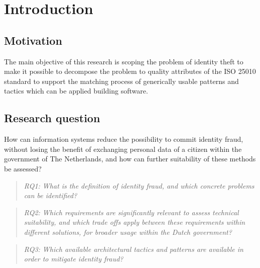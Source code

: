 \chapter{Introduction}\label{s:intro}


\section{Motivation}
The main objective of this research is scoping the problem of identity theft to make it possible to decompose the problem to quality attributes of the ISO 25010 standard \cite{ISO:25010:2011} to support the matching process of generically usable patterns and tactics which can be applied building software.

\section{Research question}
How can information systems reduce the possibility to commit identity fraud, without losing the benefit of exchanging personal data of a citizen within the government of The Netherlands, and how can further suitability of these methods be assessed?

\begin{quote}\emph{RQ1: What is the definition of identity fraud, and which concrete problems can be identified?}\end{quote}
\begin{quote}\emph{RQ2: Which requirements are significantly relevant to assess technical suitability, and which trade offs apply between these requirements within different solutions, for broader usage within the Dutch government?}\end{quote}
\begin{quote}\emph{RQ3: Which available architectural tactics and patterns are available in order to mitigate identity fraud?}\end{quote}

\break

